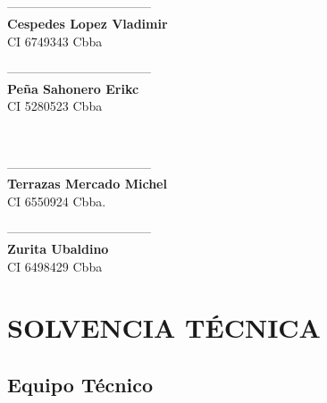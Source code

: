 \documentclass[11pt,letterpaper]{report}
\begin{document}
~\\
~\\
~\\
~\\
\begin{minipage}{0.4\textwidth}
\begin{center}
-----------------------------------\\
{\bf Cespedes Lopez Vladimir }\\
 CI 6749343 Cbba\\
\end{center}
\end{minipage}
\begin{minipage}{0.47\textwidth}
\begin{center}
-----------------------------------\\
{\bf Pe\~na Sahonero Erikc }\\
CI 5280523 Cbba
\end{center}
\end{minipage}
~\\\vspace{7em}

\begin{minipage}{0.4\textwidth}
\begin{center}
-----------------------------------\\
{\bf Terrazas Mercado Michel }\\
CI 6550924 Cbba.\\
\end{center}
\end{minipage}
\begin{minipage}{0.47\textwidth}
\begin{center}
-----------------------------------\\
{\bf Zurita Ubaldino }\\
CI 6498429 Cbba
\end{center}
\end{minipage}

\chapter{ SOLVENCIA T\'ECNICA }
\section{Equipo T\'ecnico}
\end{document}
